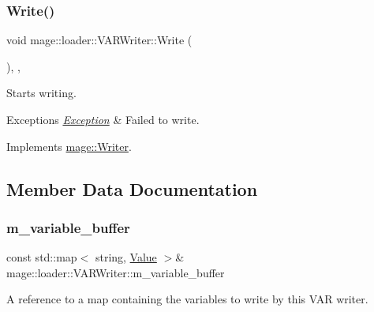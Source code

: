 \subsubsection{\texorpdfstring{Write()}{Write()}}
{\footnotesize\ttfamily void mage\+::loader\+::\+V\+A\+R\+Writer\+::\+Write (\begin{DoxyParamCaption}{ }\end{DoxyParamCaption})\hspace{0.3cm}{\ttfamily [override]}, {\ttfamily [private]}, {\ttfamily [virtual]}}

Starts writing.


\begin{DoxyExceptions}{Exceptions}
{\em \hyperlink{classmage_1_1_exception}{Exception}} & Failed to write. \\
\hline
\end{DoxyExceptions}


Implements \hyperlink{classmage_1_1_writer_a9baf695ef7f6180bef883f60bcb3ac07}{mage\+::\+Writer}.



\subsection{Member Data Documentation}
\hypertarget{classmage_1_1loader_1_1_v_a_r_writer_a405d288ded715f12f6f3c8cf29beb6a6}{}\label{classmage_1_1loader_1_1_v_a_r_writer_a405d288ded715f12f6f3c8cf29beb6a6} 
\subsubsection{\texorpdfstring{m\+\_\+variable\+\_\+buffer}{m\_variable\_buffer}}
{\footnotesize\ttfamily const std\+::map$<$ string, \hyperlink{namespacemage_aa1fe0628487e0706e44efdc62dbdb3a2}{Value} $>$\& mage\+::loader\+::\+V\+A\+R\+Writer\+::m\+\_\+variable\+\_\+buffer\hspace{0.3cm}{\ttfamily [private]}}

A reference to a map containing the variables to write by this V\+AR writer. 